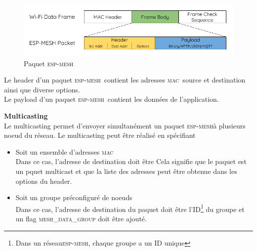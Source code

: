 \documentclass[a4paper, 12pt]{report}
\newcommand{\espmesh}{\textsc{esp-mesh}}
\newcommand{\mac}{\textsc{mac}}
\begin{document}
        \begin{figure}[h]
            \centering
            \includegraphics[scale=0.5]{images/mesh-packet.png}
            \caption{Paquet \espmesh\ \cite{ESP-MESH}}
            \label{fig_meshPacket}
        \end{figure}
        Le header d'un paquet \espmesh\ contient les adresses \mac\ source et destination ainsi que diverse options.\\
        Le payload d'un paquet \espmesh\ contient les données de l'application.
    
    \vspace{0.5cm}
    \textbf{Multicasting}\\
        Le multicasting permet d'envoyer simultanément un paquet \espmesh à plusieurs noeud du réseau. Le multicasting
        peut être réalisé en spécifiant
        \begin{itemize}
            \item Soit un ensemble d'adresses \mac\\
                Dans ce cas, l'adresse de destination doit être
                {\selectfont {}}
                Cela signifie que le paquet est un pquet multicast et que la liste des adresses peut être obtenue dans les options du header.
            \item Soit un groupe préconfiguré de noeuds\\
                Dans ce cas, l'adresse de destination du paquet doit être l'ID\footnote{Dans un réseau\espmesh, chaque groupe a un ID unique}
                du groupe et un flag \textsc{mesh\_data\_group} doit être ajouté.
        \end{itemize}
\end{document}
